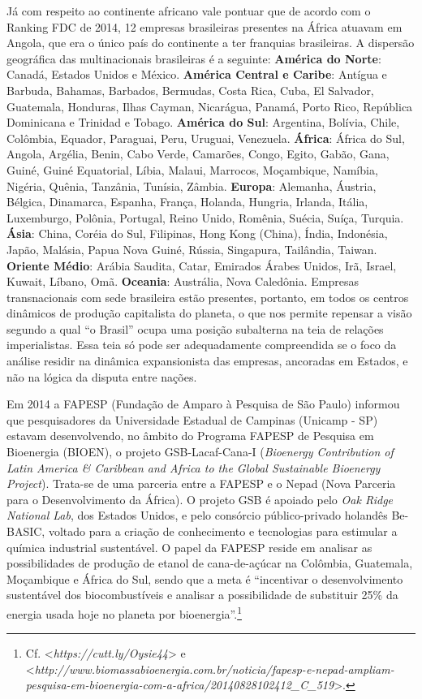 Já com respeito ao continente africano vale pontuar que de acordo com o
Ranking FDC de 2014, 12 empresas brasileiras presentes na África atuavam
em Angola, que era o único país do continente a ter franquias
brasileiras. A dispersão geográfica das multinacionais brasileiras é a
seguinte: \textbf{América do Norte}: Canadá, Estados Unidos e México.
\textbf{América Central e Caribe}: Antígua e Barbuda, Bahamas, Barbados,
Bermudas, Costa Rica, Cuba, El Salvador, Guatemala, Honduras, Ilhas
Cayman, Nicarágua, Panamá, Porto Rico, República Dominicana e Trinidad e
Tobago. \textbf{América do Sul}: Argentina, Bolívia, Chile, Colômbia,
Equador, Paraguai, Peru, Uruguai, Venezuela. \textbf{África}: África do
Sul, Angola, Argélia, Benin, Cabo Verde, Camarões, Congo, Egito, Gabão,
Gana, Guiné, Guiné Equatorial, Líbia, Malaui, Marrocos, Moçambique,
Namíbia, Nigéria, Quênia, Tanzânia, Tunísia, Zâmbia. \textbf{Europa}:
Alemanha, Áustria, Bélgica, Dinamarca, Espanha, França, Holanda,
Hungria, Irlanda, Itália, Luxemburgo, Polônia, Portugal, Reino Unido,
Romênia, Suécia, Suíça, Turquia. \textbf{Ásia}: China, Coréia do Sul,
Filipinas, Hong Kong (China), Índia, Indonésia, Japão, Malásia, Papua
Nova Guiné, Rússia, Singapura, Tailândia, Taiwan. \textbf{Oriente
Médio}: Arábia Saudita, Catar, Emirados Árabes Unidos, Irã, Israel,
Kuwait, Líbano, Omã. \textbf{Oceania}: Austrália, Nova Caledônia.
Empresas transnacionais com sede brasileira estão presentes, portanto,
em todos os centros dinâmicos de produção capitalista do planeta, o que
nos permite repensar a visão segundo a qual ``o Brasil'' ocupa uma
posição subalterna na teia de relações imperialistas. Essa teia só pode
ser adequadamente compreendida se o foco da análise residir na dinâmica
expansionista das empresas, ancoradas em Estados, e não na lógica da
disputa entre nações.

Em 2014 a FAPESP (Fundação de Amparo à Pesquisa de São Paulo) informou
que pesquisadores da Universidade Estadual de Campinas (Unicamp - SP)
estavam desenvolvendo, no âmbito do Programa FAPESP de Pesquisa em
Bioenergia (BIOEN), o projeto GSB-Lacaf-Cana-I (\emph{Bioenergy
Contribution of Latin America \& Caribbean and Africa to the Global
Sustainable Bioenergy Project}). Trata-se de uma parceria entre a FAPESP
e o Nepad (Nova Parceria para o Desenvolvimento da África). O projeto
GSB é apoiado pelo \emph{Oak Ridge National Lab}, dos Estados Unidos, e
pelo consórcio público-privado holandês Be-BASIC, voltado para a criação
de conhecimento e tecnologias para estimular a química industrial
sustentável. O papel da FAPESP reside em analisar as possibilidades de
produção de etanol de cana-de-açúcar na Colômbia, Guatemala, Moçambique
e África do Sul, sendo que a meta é ``incentivar o desenvolvimento
sustentável dos biocombustíveis e analisar a possibilidade de substituir
25\% da energia usada hoje no planeta por bioenergia''.\footnote{Cf.
  \textless{}\emph{https://cutt.ly/Oysie44}\textgreater{}
  e
  \textless{}\emph{http://www.biomassabioenergia.com.br/noticia/fapesp-e-nepad-ampliam-pesquisa-em-bioenergia-com-a-africa/20140828102412\_C\_519}\textgreater{}.}

